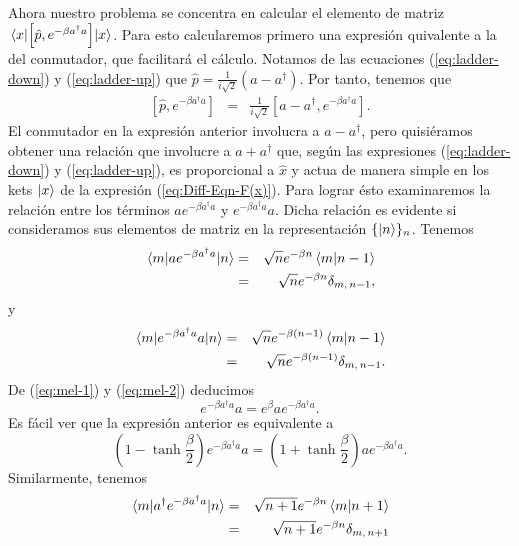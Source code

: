 \documentclass[%
 reprint,
 amsmath,amssymb,
 aps,
 pra,
]{revtex4-2}
\begin{document}
Ahora nuestro problema se concentra en calcular el elemento de matriz $\ev{\left[\hat{p},e^{-\beta a^\dag a}\right]}{x}$. Para esto calcularemos primero una expresión quivalente a la del conmutador, que facilitará el cálculo. Notamos de las ecuaciones (\ref{eq:ladder-down}) y (\ref{eq:ladder-up}) que $\hat{p} = \frac{1}{i\sqrt{2}}\left(a-a^\dag\right)$. Por tanto, tenemos que
\begin{eqnarray}
\left[\hat{p},e^{-\beta a^\dag a}\right] 	&=& \frac{1}{i\sqrt{2}}\left[a-a^\dag,e^{-\beta a^\dag a}\right]. \label{eq:commutator}
\end{eqnarray}
El conmutador en la expresión anterior involucra a $a-a^\dag$, pero quisiéramos obtener una relación que involucre a $a+a^\dag$ que, según las expresiones (\ref{eq:ladder-down}) y (\ref{eq:ladder-up}), es proporcional a $\hat{x}$ y actua de manera simple en los kets $\ket{x}$ de la expresión (\ref{eq:Diff-Eqn-F(x)}). Para lograr ésto examinaremos la relación entre los términos $a e^{-\beta a^\dag a}$ y $e^{-\beta a^\dag a}a$. Dicha relación es evidente si consideramos sus elementos de matriz en la representación $\{\ket{n}\}_n$. Tenemos
\begin{eqnarray}
\mel{m}{a e^{-\beta a^\dag a}}{n} 	&=& \sqrt{n}e^{-\beta n} \braket{m}{n-1} \nonumber \\
									&=&  \sqrt{n}e^{-\beta n} \delta_{m,\,n-1}, \label{eq:mel-1}
\end{eqnarray}
y
\begin{eqnarray}
\mel{m}{e^{-\beta a^\dag a} a}{n} 	&=& \sqrt{n}e^{-\beta (n-1)} \braket{m}{n-1} \nonumber\\
									&=&  \sqrt{n}e^{-\beta (n-1)} \delta_{m,\,n-1}. \label{eq:mel-2}
\end{eqnarray}
De (\ref{eq:mel-1}) y (\ref{eq:mel-2}) deducimos 
\begin{equation}
e^{-\beta a^\dag a} a = e^\beta a e^{-\beta a^\dag a}.
\end{equation}
Es fácil ver que la expresión anterior es equivalente a
\begin{equation}
\left(1-\tanh\frac{\beta}{2}\right)e^{-\beta a^\dag a} a = \left(1+\tanh\frac{\beta}{2}\right) a e^{-\beta a^\dag a}. \label{eq:relation-a-times-exp}
\end{equation}
Similarmente, tenemos
\begin{eqnarray}
\mel{m}{a^\dag e^{-\beta a^\dag a}}{n} 	&=& \sqrt{n+1}e^{-\beta n} \braket{m}{n+1} \nonumber \\
									&=&  \sqrt{n+1}e^{-\beta n} \delta_{m,\,n+1} \label{eq:mel-3}
\end{eqnarray}
\end{document}
